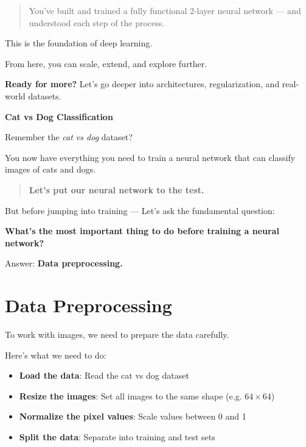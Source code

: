 \documentclass[11pt]{article}
\begin{document}
\begin{quote}
You've built and trained a fully functional 2-layer neural network —  
and understood each step of the process.
\end{quote}

This is the foundation of deep learning.

From here, you can scale, extend, and explore further.

\bigskip

\noindent \textbf{Ready for more?}  
Let’s go deeper into architectures, regularization, and real-world datasets.

\newpage
\begin{center}
    \Huge \textbf{Cat vs Dog Classification}
\end{center}
\noindent

Remember the \textit{cat vs dog} dataset?

You now have everything you need to train a neural network that can classify images of cats and dogs.

\begin{quote}
\textbf{Let’s put our neural network to the test.}
\end{quote}

But before jumping into training —  
Let’s ask the fundamental question:

\begin{center}
\Large \textbf{What’s the most important thing to do before training a neural network?}
\end{center}

\vspace{0.5em}
Answer: \textbf{Data preprocessing.}

\section*{Data Preprocessing}

To work with images, we need to prepare the data carefully.

\vspace{1em}

Here’s what we need to do:

\begin{itemize}
    \item \textbf{Load the data}: Read the cat vs dog dataset
    \item \textbf{Resize the images}: Set all images to the same shape (e.g. $64 \times 64$)
    \item \textbf{Normalize the pixel values}: Scale values between 0 and 1
    \item \textbf{Split the data}: Separate into training and test sets
\end{itemize}
\end{document}
